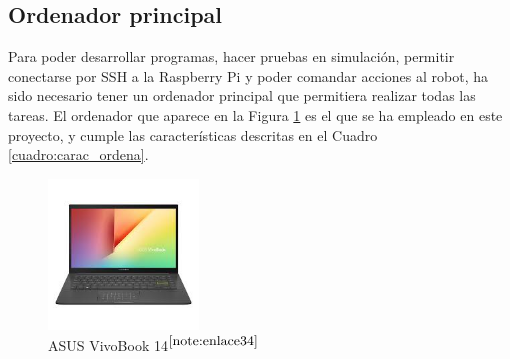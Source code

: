 \setcounter{footnote}{33} %

\subsection{Ordenador principal}
\label{subsec:ordenador}

Para poder desarrollar programas, hacer pruebas en simulación, permitir conectarse por SSH a la Raspberry Pi y poder comandar acciones al robot, ha sido necesario tener un ordenador principal que permitiera realizar todas las tareas. El ordenador que aparece en la Figura \ref{fig:ordenador} es el que se ha empleado en este proyecto, y cumple las características descritas en el Cuadro \ref{cuadro:carac_ordena}.


\begin{figure} [h!]
	\begin{center}
		\includegraphics[width=4cm]{figs/ordenador.png}
	\end{center}
	\caption{ASUS VivoBook 14$^{\ref{note:enlace34}}$} 
	\label{fig:ordenador}
\end{figure}

\setcounter{footnote}{34} %

